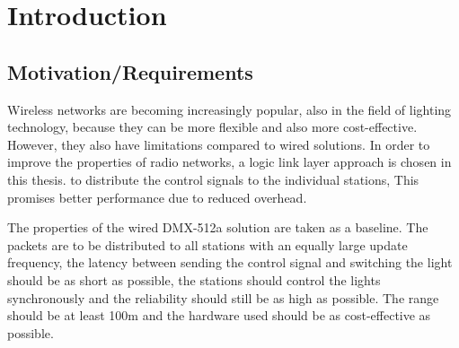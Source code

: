\chapter{Introduction}


\section*{Motivation/Requirements}

Wireless networks are becoming increasingly popular, also in the field of lighting technology,
because they can be more flexible and also more cost-effective.
However, they also have limitations compared to wired solutions.
In order to improve the properties of radio networks, a logic link layer approach is chosen in this thesis.
to distribute the control signals to the individual stations,
This promises better performance due to reduced overhead.

The properties of the wired DMX-512a solution are taken as a baseline.
The packets are to be distributed to all stations with an equally large update frequency,
the latency between sending the control signal and switching the light should be as short as possible,
the stations should control the lights synchronously and the reliability should still be as high as possible.
The range should be at least 100m and the hardware used should be as cost-effective as possible.

